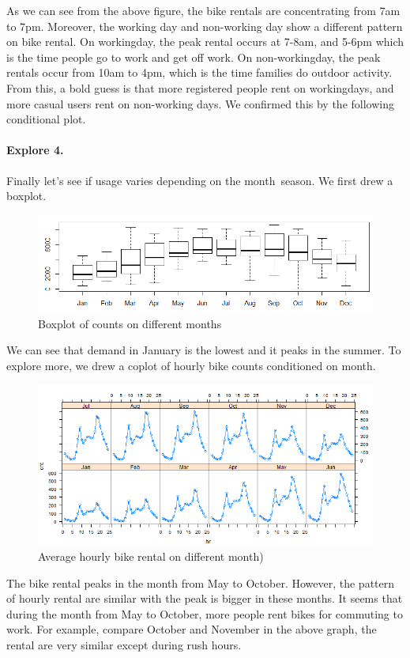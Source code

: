 \documentclass[12pt]{article}
\begin{document}
	As we can see from the above figure, the bike rentals are concentrating from 7am to 7pm. Moreover, the working day and non-working day show a different pattern on bike rental. On workingday, the peak rental occurs at 7-8am, and 5-6pm which is the time people go to work and get off work. On non-workingday, the peak rentals occur from 10am to 4pm, which is the time families do outdoor activity.  From this, a bold guess is that more registered people rent on workingdays, and more casual users rent on non-working days. We confirmed this by the following conditional plot.
	
	
	\paragraph*{Explore 4.} Finally let’s see if usage varies depending on the month\ season. We first drew a boxplot. 
	\begin{figure}[H]
		\centering
		\includegraphics[scale=.6]{figures/month_count.png}
		\caption{Boxplot of counts on different months}
	\end{figure}
	
	We can see that demand in January is the lowest and it peaks in the summer. To explore more, we drew a coplot of hourly bike counts conditioned on month.
	
	\begin{figure}[H]
		\centering
		\includegraphics[scale=1]{figures/cnt_hr_mnth.png}
		\caption{Average hourly bike rental on different month)}
	\end{figure}
	The bike rental peaks in the month from May to October. However, the pattern of hourly rental are similar with the peak is bigger in these months. It seems that during the month from May to October, more people rent bikes for commuting to work. For example, compare October and November in the above graph, the rental are very similar except during rush hours. 
	
\end{document}
